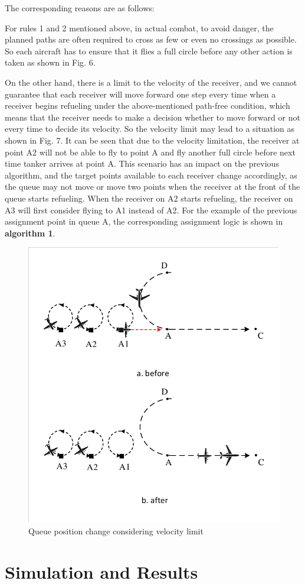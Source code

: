 The corresponding reasons are as follows:


For rules 1 and 2 mentioned above, in actual combat, to avoid danger, the planned paths are often required to cross as few or even no crossings as possible. So each aircraft has to ensure that it flies a full circle before any other action is taken as shown in Fig. 6.

On the other hand, there is a limit to the velocity of the receiver, and we cannot guarantee that each receiver will move forward one step every time when a receiver begins refueling under the above-mentioned path-free condition, which means that the receiver needs to make a decision whether to move forward or not every time to decide its velocity. So the velocity limit may lead to a situation as shown in Fig. 7. It can be seen that due to the velocity limitation, the receiver at point A2 will not be able to fly to point A and fly another full circle before  next time tanker arrives at point A.  This scenario has an impact on the previous algorithm, and the target points available to each receiver change accordingly, as the queue may not move or move two points when the receiver at the front of the queue starts refueling. When the receiver on A2 starts refueling, the receiver on A3 will first consider flying to A1 instead of A2. 
For the example of the previous assignment point in queue A, the corresponding assignment logic is shown in \textbf{algorithm 1}.
\begin{figure}[htbp]
	\centerline{\includegraphics[width=.4\textwidth]{Figures/Figs_Ch15/Fig7.pdf}}
	\caption{Queue position change considering velocity limit}
	\label{fig}
\end{figure}


\section{Simulation and Results}



